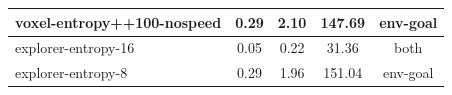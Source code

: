 \begin{longtable}{|l|c|c|c|c|}
{\cellcolor[HTML]{D7C5AF}} \color[HTML]{000000}         voxel-entropy++100-nospeed & 0.29 & 2.10 & 147.69 &         {\cellcolor[HTML]{D7C5AF}} \color[HTML]{000000}     env-goal \\ \hline
{\cellcolor[HTML]{B5C3D7}} \color[HTML]{000000}         explorer-entropy-16 & 0.05 & 0.22 & 31.36 &                 {\cellcolor[HTML]{B5C3D7}} \color[HTML]{000000} both \\ \hline
{\cellcolor[HTML]{D7C5AF}} \color[HTML]{000000}         explorer-entropy-8 & 0.29 & 1.96 & 151.04 &                 {\cellcolor[HTML]{D7C5AF}} \color[HTML]{000000}   env-goal \\ \hline

   
    
    
    

\end{longtable}
